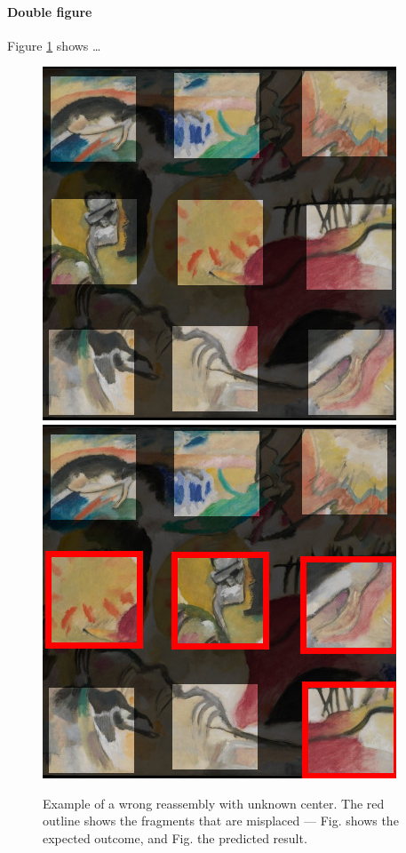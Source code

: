 \paragraph{Double figure} Figure \ref{fig:res1:fig3} shows … \blindtext

\begin{figure}
    \centering
    \subfloat[\label{fig:dz:09_sol}]{\qquad}
    \includegraphics[width=0.4\linewidth]{30-part1/img/09_sol.jpg}\hfill
    \subfloat[\label{fig:dz:09_rea}]{\qquad}
    \includegraphics[width=0.4\linewidth]{30-part1/img/09_res.jpg}
    \caption[An erroneous reassembly with unknown center]{Example of a wrong reassembly with unknown center. The red outline shows the fragments that are misplaced  --- Fig. \protect{} shows the expected outcome, and Fig. \protect{} the predicted result.}
    \label{fig:res1:fig3}
\end{figure}

